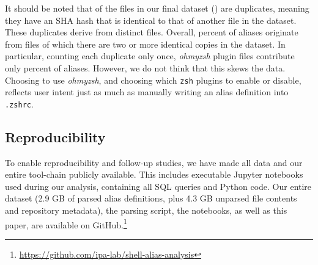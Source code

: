 It should be noted that  of the files in our final dataset () are duplicates, meaning they have an SHA hash that is identical to that of another file in the dataset.
These duplicates derive from  distinct files.
Overall,  percent of aliases originate from files of which there are two or more identical copies in the dataset.
In particular, counting each duplicate only once, \emph{ohmyzsh} plugin files contribute only  percent of aliases.
However, we do not think that this skews the data.
Choosing to use \emph{ohmyzsh}, and choosing which \texttt{zsh} plugins to enable or disable, reflects user intent just as much as manually writing an alias definition into \texttt{.zshrc}.

\subsection{Reproducibility}

To enable reproducibility and follow-up studies, we have made all data and our entire tool-chain publicly available.
This includes executable Jupyter notebooks used during our analysis, containing all SQL queries and Python code.
Our entire dataset (2.9 GB of parsed alias definitions, plus 4.3 GB unparsed file contents and repository metadata), the parsing script, the notebooks, as well as this paper, are available on GitHub.\footnote{\url{https://github.com/ipa-lab/shell-alias-analysis}}

